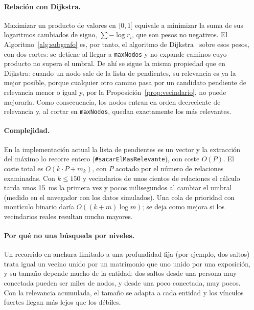 \paragraph{Relación con Dijkstra.} Maximizar un producto de valores en $(0,1]$ equivale a minimizar la suma de sus logaritmos cambiados de signo, $\sum -\log r_i$, que son pesos no negativos. El Algoritmo~\ref{alg:subgrafo} es, por tanto, el algoritmo de Dijkstra~\cite{dijkstra1959} sobre esos pesos, con dos cortes: se detiene al llegar a \texttt{maxNodos} y no expande caminos cuyo producto no supera el umbral. De ahí se sigue la misma propiedad que en Dijkstra: cuando un nodo sale de la lista de pendientes, su relevancia es ya la mejor posible, porque cualquier otro camino pasa por un candidato pendiente de relevancia menor o igual y, por la Proposición~\ref{prop:vecindario}, no puede mejorarla. Como consecuencia, los nodos entran en orden decreciente de relevancia y, al cortar en \texttt{maxNodos}, quedan exactamente los más relevantes.

\paragraph{Complejidad.} En la implementación actual la lista de pendientes es un vector y la extracción del máximo lo recorre entero (\texttt{\#sacarElMasRelevante}), con coste $O(P)$. El coste total es $O(k\cdot P + m_k)$, con $P$ acotado por el número de relaciones examinadas. Con $k\le150$ y vecindarios de unos cientos de relaciones el cálculo tarda unos 15~ms la primera vez y pocos milisegundos al cambiar el umbral (medido en el navegador con los datos simulados). Una cola de prioridad con montículo binario daría $O((k+m)\log m)$; se deja como mejora si los vecindarios reales resultan mucho mayores. 

\paragraph{Por qué no una búsqueda por niveles.} Un recorrido en anchura limitado a una profundidad fija (por ejemplo, dos saltos) trata igual un vecino unido por un matrimonio que uno unido por una exposición, y su tamaño depende mucho de la entidad: dos saltos desde una persona muy conectada pueden ser miles de nodos, y desde una poco conectada, muy pocos. Con la relevancia acumulada, el tamaño se adapta a cada entidad y los vínculos fuertes llegan más lejos que los débiles.

